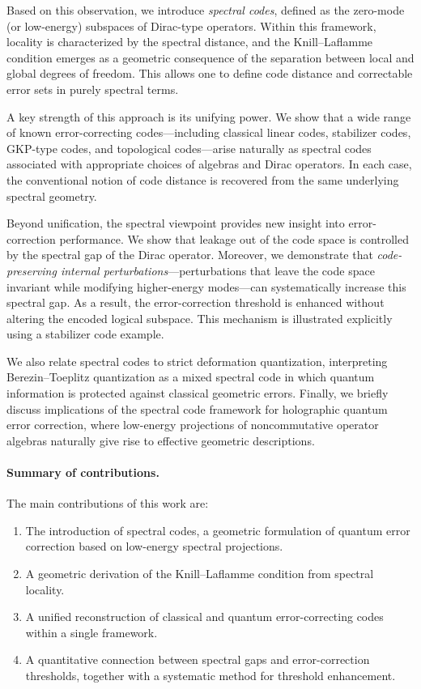 \documentclass[12pt]{article}
\theoremstyle{definition} %
\theoremstyle{plain} %
\theoremstyle{remark} %
\theoremstyle{underline}
\begin{document}
Based on this observation, we introduce \emph{spectral codes}, defined as the zero-mode (or low-energy) subspaces of Dirac-type operators. Within this framework, locality is characterized by the spectral distance, and the Knill--Laflamme condition emerges as a geometric consequence of the separation between local and global degrees of freedom. This allows one to define code distance and correctable error sets in purely spectral terms.

A key strength of this approach is its unifying power. We show that a wide range of known error-correcting codes---including classical linear codes, stabilizer codes, GKP-type codes, and topological codes---arise naturally as spectral codes associated with appropriate choices of algebras and Dirac operators. In each case, the conventional notion of code distance is recovered from the same underlying spectral geometry.

Beyond unification, the spectral viewpoint provides new insight into error-correction performance. We show that leakage out of the code space is controlled by the spectral gap of the Dirac operator. Moreover, we demonstrate that \emph{code-preserving internal perturbations}---perturbations that leave the code space invariant while modifying higher-energy modes---can systematically increase this spectral gap. As a result, the error-correction threshold is enhanced without altering the encoded logical subspace. This mechanism is illustrated explicitly using a stabilizer code example.

We also relate spectral codes to strict deformation quantization, interpreting Berezin--Toeplitz quantization as a mixed spectral code in which quantum information is protected against classical geometric errors. Finally, we briefly discuss implications of the spectral code framework for holographic quantum error correction, where low-energy projections of noncommutative operator algebras naturally give rise to effective geometric descriptions.

\paragraph{Summary of contributions.}
The main contributions of this work are:
\begin{enumerate}
  \item The introduction of spectral codes, a geometric formulation of quantum error correction based on low-energy spectral projections.
  \item A geometric derivation of the Knill--Laflamme condition from spectral locality.
  \item A unified reconstruction of classical and quantum error-correcting codes within a single framework.
  \item A quantitative connection between spectral gaps and error-correction thresholds, together with a systematic method for threshold enhancement.
\end{enumerate}
\end{document}
